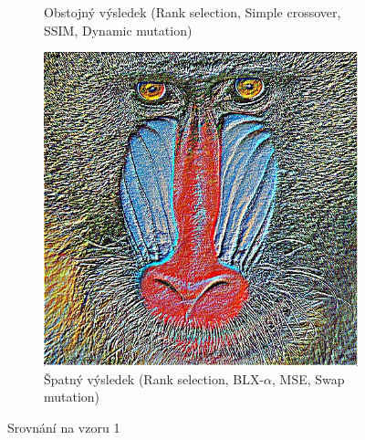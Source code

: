 \documentclass[a4paper,11pt,titlepage]{scrartcl}
\begin{document}
\begin{figure}[!h]
\begin{subfigure}[b]{0.32\textwidth}
        \caption{Obstojný výsledek (Rank selection, Simple crossover, SSIM, Dynamic mutation)}
        \label{fig:ex12}
    \end{subfigure}
    \begin{subfigure}[b]{0.32\textwidth}
        \includegraphics[width=\textwidth]{img/ranksel-blx_a-mse-swap_example1.jpg}
        \caption{Špatný výsledek (Rank selection, BLX-$\alpha$, MSE, Swap mutation)}
        \label{fig:ex13}
    \end{subfigure}
    \caption{Srovnání na vzoru 1}
    \label{porovnani_ex1}
\end{figure}
\end{document}
